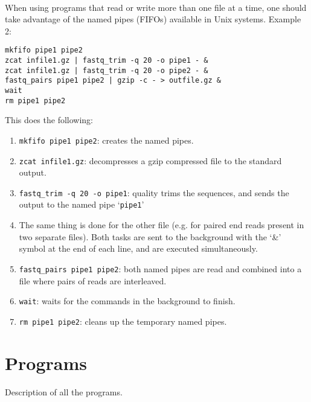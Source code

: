 \documentclass[a4paper,12pt]{article}
\begin{document}
\paragraph{}
When using programs that read or write more than one file at a time, one should take
advantage of the named pipes (FIFOs) available in Unix systems.
Example 2:
\begin{verbatim}
mkfifo pipe1 pipe2
zcat infile1.gz | fastq_trim -q 20 -o pipe1 - &
zcat infile1.gz | fastq_trim -q 20 -o pipe2 - &
fastq_pairs pipe1 pipe2 | gzip -c - > outfile.gz &
wait
rm pipe1 pipe2
\end{verbatim}
This does the following:
\begin{enumerate}
    \item \texttt{mkfifo pipe1 pipe2}: creates the named pipes.
    \item \texttt{zcat infile1.gz}: decompresses a gzip compressed file to the
        standard output.
    \item \texttt{fastq\_trim -q 20 -o pipe1}: quality trims the sequences, and
        sends the output to the named pipe `\texttt{pipe1}'
    \item The same thing is done for the other file (e.g. for paired end reads
        present in two separate files).  Both tasks are sent to the background
        with the `\&' symbol at the end of each line, and are executed
        simultaneously.
    \item \texttt{fastq\_pairs pipe1 pipe2}: both named pipes are read and
        combined into a file where pairs of reads are interleaved.
    \item \texttt{wait}: waits  for the commands in the background to finish.
    \item \texttt{rm pipe1 pipe2}: cleans up the temporary named pipes.
\end{enumerate}


\section{Programs}

Description of all the programs.

\end{document}
